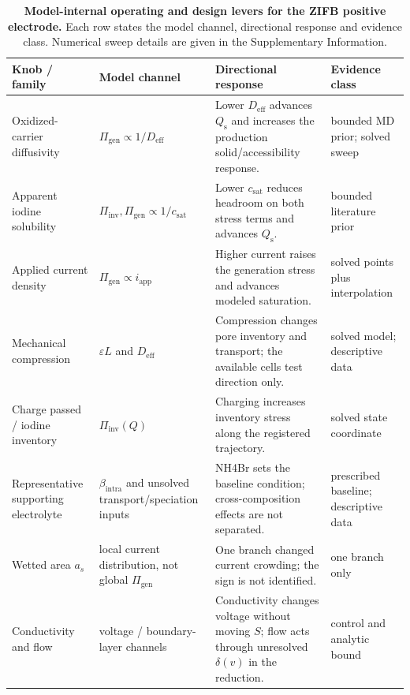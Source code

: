 \documentclass[11pt]{article}
\newcommand{\csat}{c_{\mathrm{sat}}}
\newcommand{\epsl}{\varepsilon}
\newcommand{\iapp}{i_{\mathrm{app}}}
\newcommand{\Deff}{D_{\mathrm{eff}}}
\begin{document}
\begin{table}[t]\centering\small
\caption{\textbf{Model-internal operating and design levers for the ZIFB positive electrode.}
Each row states the model channel, directional response and evidence class. Numerical sweep details are given
in the Supplementary Information.}
\label{tab:knobs}
\begin{tabular}{@{}p{3.0cm} p{3.5cm} p{6.2cm} p{2.2cm}@{}}
\toprule
Knob / family & Model channel & Directional response & Evidence class\\
\midrule
Oxidized-carrier diffusivity & $\Pi_{\mathrm{gen}}\propto1/\Deff$ & Lower $\Deff$ advances $Q_{\mathrm s}$ and increases the production solid/accessibility response. & bounded MD prior; solved sweep\\[2pt]
Apparent iodine solubility & $\Pi_{\mathrm{inv}},\Pi_{\mathrm{gen}}\propto1/\csat$ & Lower $\csat$ reduces headroom on both stress terms and advances $Q_{\mathrm s}$. & bounded literature prior\\[2pt]
Applied current density & $\Pi_{\mathrm{gen}}\propto\iapp$ & Higher current raises the generation stress and advances modeled saturation. & solved points plus interpolation\\[2pt]
Mechanical compression & $\epsl L$ and $\Deff$ & Compression changes pore inventory and transport; the available cells test direction only. & solved model; descriptive data\\[2pt]
Charge passed / iodine inventory & $\Pi_{\mathrm{inv}}(Q)$ & Charging increases inventory stress along the registered trajectory. & solved state coordinate\\[2pt]
Representative supporting electrolyte & $\beta_{\mathrm{intra}}$ and unsolved transport/speciation inputs & NH4Br sets the baseline condition; cross-composition effects are not separated. & prescribed baseline; descriptive data\\[2pt]
Wetted area $a_s$ & local current distribution, not global $\Pi_{\mathrm{gen}}$ & One branch changed current crowding; the sign is not identified. & one branch only\\[2pt]
Conductivity and flow & voltage / boundary-layer channels & Conductivity changes voltage without moving $S$; flow acts through unresolved $\delta(v)$ in the reduction. & control and analytic bound\\
\bottomrule
\end{tabular}
\end{table}
\end{document}
